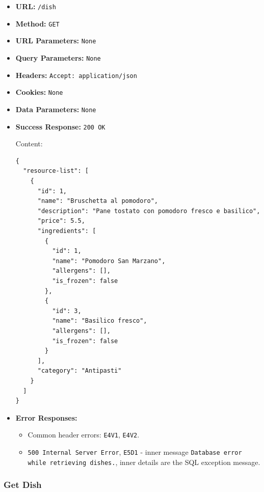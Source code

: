 \begin{itemize}[nosep]
\item \textbf{URL:} \texttt{/dish}

\item \textbf{Method:} \texttt{GET}

\item \textbf{URL Parameters:} \texttt{None}

\item \textbf{Query Parameters:} \texttt{None}

\item \textbf{Headers:} \texttt{Accept: application/json}

\item \textbf{Cookies:} \texttt{None}

\item \textbf{Data Parameters:} \texttt{None}

\item \textbf{Success Response:} \texttt{200 OK}

Content:

\begin{lstlisting}
{
  "resource-list": [
    {
      "id": 1,
      "name": "Bruschetta al pomodoro",
      "description": "Pane tostato con pomodoro fresco e basilico",
      "price": 5.5,
      "ingredients": [
        {
          "id": 1,
          "name": "Pomodoro San Marzano",
          "allergens": [],
          "is_frozen": false
        },
        {
          "id": 3,
          "name": "Basilico fresco",
          "allergens": [],
          "is_frozen": false
        }
      ],
      "category": "Antipasti"
    }
  ]
}
\end{lstlisting}

\item \textbf{Error Responses:}

\begin{itemize}[nosep]
\item Common header errors: \texttt{E4V1}, \texttt{E4V2}.
\item \texttt{500 Internal Server Error}, \texttt{E5D1} - inner message \texttt{Database error while retrieving dishes.}, inner details are the SQL exception message.
\end{itemize}

\end{itemize}

\subsubsection*{Get Dish}

